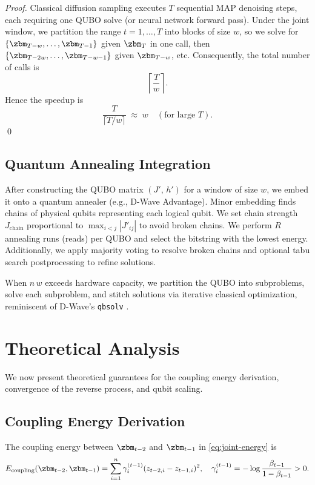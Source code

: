 \documentclass[11pt,letterpaper]{article}
\begin{document}
\begin{proof}
Classical diffusion sampling executes $T$ sequential MAP denoising steps, each requiring one QUBO solve (or neural network forward pass). Under the joint window, we partition the range $t=1,\ldots,T$ into blocks of size $w$, so we solve for $\{\zbm_{T-w},\ldots,\zbm_{T-1}\}$ given $\zbm_T$ in one call, then $\{\zbm_{T-2w},\ldots,\zbm_{T-w-1}\}$ given $\zbm_{T-w}$, etc. Consequently, the total number of calls is
\[
\left\lceil \frac{T}{w} \right\rceil.
\]
Hence the speedup is
\[
\frac{T}{\lceil T / w \rceil} \;\approx\; w \quad (\text{for large } T).
\]
\qed
\end{proof}

\subsection{Quantum Annealing Integration}
\label{subsec:quantum-integration}

After constructing the QUBO matrix $(J',\,h')$ for a window of size $w$, we embed it onto a quantum annealer (e.g., D-Wave Advantage). Minor embedding finds chains of physical qubits representing each logical qubit. We set chain strength $J_{\text{chain}}$ proportional to $\max_{i<j} |J'_{ij}|$ to avoid broken chains. We perform $R$ annealing runs (reads) per QUBO and select the bitstring with the lowest energy. Additionally, we apply majority voting to resolve broken chains and optional tabu search postprocessing to refine solutions.

When $n\,w$ exceeds hardware capacity, we partition the QUBO into subproblems, solve each subproblem, and stitch solutions via iterative classical optimization, reminiscent of D-Wave's \texttt{qbsolv} \cite{glover2018tutorial}.

\section{Theoretical Analysis}
\label{sec:theory}

We now present theoretical guarantees for the coupling energy derivation, convergence of the reverse process, and qubit scaling.

\subsection{Coupling Energy Derivation}
\label{subsec:coupling-proof}

\begin{proposition}
\label{prop:coupling-derivation}
The coupling energy between $\zbm_{t-2}$ and $\zbm_{t-1}$ in \eqref{eq:joint-energy} is
\[
E_{\text{coupling}}(\zbm_{t-2}, \zbm_{t-1}) 
= \sum_{i=1}^n \gamma_i^{(t-1)} (z_{t-2,i} - z_{t-1,i})^2,
\quad \gamma_i^{(t-1)} = -\log\frac{\beta_{t-1}}{1-\beta_{t-1}} > 0.
\]
\end{proposition}
\end{document}
